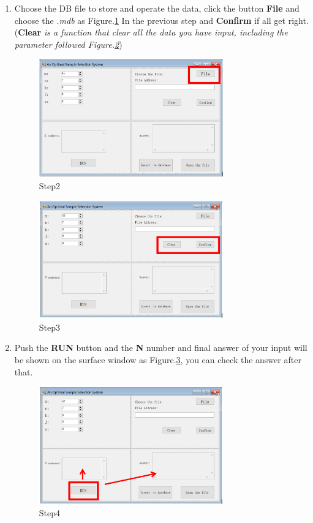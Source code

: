 \begin{enumerate}
\item Choose the DB file to store and operate the data, click the button \textbf{File} and choose the \emph{.mdb} as Figure.\ref{fig:st2}
In the previous step and \textbf{Confirm} if all get right.(\textbf{Clear}\textit{ is a function that clear all the data you have input, 
including the parameter followed \textup{Figure.\ref{fig:st3}}})
\begin{figure}[!htbp]
	\centering
	\includegraphics[width=0.75\textwidth]{images/step2.png}
	\caption{Step2}
	\label{fig:st2}
\end{figure}
\begin{figure}[!htbp]
	\centering
	\includegraphics[width=0.75\textwidth]{images/step3.png}
	\caption{Step3}
	\label{fig:st3}
\end{figure}

\item Push the \textbf{RUN} button and the \textbf{N} number and final answer of your input will be shown 
on the surface window as Figure.\ref{fig:st4}, you can check the answer after that.
\begin{figure}[!htbp]
	\centering
	\includegraphics[width=0.75\textwidth]{images/step4.png}
	\caption{Step4}
	\label{fig:st4}
\end{figure}


\end{enumerate}
